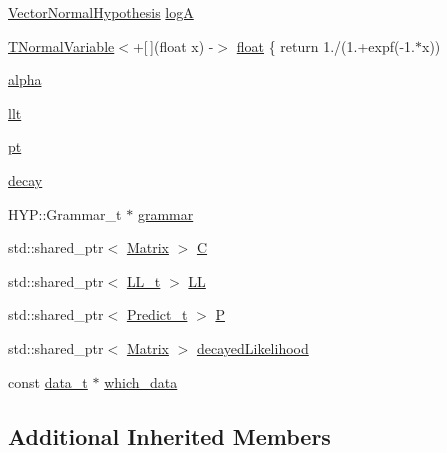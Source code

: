 \begin{DoxyCompactItemize}
\item 
\hyperlink{class_vector_normal_hypothesis}{Vector\+Normal\+Hypothesis} \hyperlink{class_grammar_hypothesis_a8b6e2526b457a656511dda7eb4b9e546}{logA}
\item 
\hyperlink{class_t_normal_variable}{T\+Normal\+Variable}$<$+\mbox{[}$\,$\mbox{]}(float x) -\/$>$ \hyperlink{class_grammar_hypothesis_aff7618f98de8737df436c86424cc62ed}{float} \{ return 1./(1.+expf(-\/1.$\ast$x))
\item 
\hyperlink{class_grammar_hypothesis_aad05b11be3c0249d8a22ab078d28635c}{alpha}
\item 
\hyperlink{class_grammar_hypothesis_a0c8f321de22c6e78d95b0e265f346892}{llt}
\item 
\hyperlink{class_grammar_hypothesis_a3dfa8da300156a045ac542bdd5364e0f}{pt}
\item 
\hyperlink{class_grammar_hypothesis_a1ff45b8e4d4e7ace3dcddb6dab5c5c58}{decay}
\item 
H\+Y\+P\+::\+Grammar\+\_\+t $\ast$ \hyperlink{class_grammar_hypothesis_afa17cc4569b9ac59eb3d232919a73917}{grammar}
\item 
std\+::shared\+\_\+ptr$<$ \hyperlink{_eigen_lib_8h_a645222978e81acfb2523a9bce34aecc0}{Matrix} $>$ \hyperlink{class_grammar_hypothesis_a2b056bde1754e6e18d9a7ebfa753fc60}{C}
\item 
std\+::shared\+\_\+ptr$<$ \hyperlink{class_grammar_hypothesis_a7c6a6c59b0ba1ca6e225079d0cb7143b}{L\+L\+\_\+t} $>$ \hyperlink{class_grammar_hypothesis_a03f4757e1c6cbf99319dda821d061fe3}{LL}
\item 
std\+::shared\+\_\+ptr$<$ \hyperlink{class_grammar_hypothesis_aa5ecc4d2215fa50a9c2b4e7c682c7cd7}{Predict\+\_\+t} $>$ \hyperlink{class_grammar_hypothesis_a9b3df606fce3805c6cd1ba2dd542a73c}{P}
\item 
std\+::shared\+\_\+ptr$<$ \hyperlink{_eigen_lib_8h_a645222978e81acfb2523a9bce34aecc0}{Matrix} $>$ \hyperlink{class_grammar_hypothesis_a9e543dfed61a4196c98135409d4b264c}{decayed\+Likelihood}
\item 
const \hyperlink{class_bayesable_aa2788c4d7718c0a824e1d28c4c98f921}{data\+\_\+t} $\ast$ \hyperlink{class_grammar_hypothesis_a91f16aecf3f2a1e9bd1386c846635dba}{which\+\_\+data}
\end{DoxyCompactItemize}
\subsection*{Additional Inherited Members}


